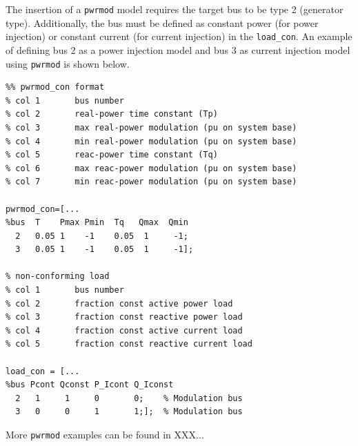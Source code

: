 The insertion of a \verb|pwrmod| model requires the target bus to be type 2 (generator type).
Additionally, the bus must be defined as constant power (for power injection) or constant current (for current injection) in the \verb|load_con|.
An example of defining bus 2 as a power injection model and bus 3 as current injection model using \verb|pwrmod| is shown below.
\begin{verbatim}
%% pwrmod_con format
% col 1       bus number
% col 2       real-power time constant (Tp)
% col 3       max real-power modulation (pu on system base)
% col 4       min real-power modulation (pu on system base)
% col 5       reac-power time constant (Tq)
% col 6       max reac-power modulation (pu on system base)
% col 7       min reac-power modulation (pu on system base)

pwrmod_con=[...
%bus  T    Pmax Pmin  Tq   Qmax  Qmin
  2   0.05 1    -1    0.05  1     -1; 
  3   0.05 1    -1    0.05  1     -1];

% non-conforming load
% col 1       bus number
% col 2       fraction const active power load
% col 3       fraction const reactive power load
% col 4       fraction const active current load
% col 5       fraction const reactive current load

load_con = [...
%bus Pcont Qconst P_Icont Q_Iconst
  2   1     1     0       0;    % Modulation bus
  3   0     0     1       1;];  % Modulation bus
\end{verbatim}

More \verb|pwrmod| examples can be found in XXX...